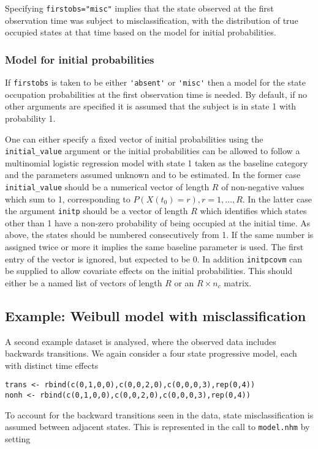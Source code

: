 \documentclass{article}
\numberwithin{equation}{section}
\begin{document}
Specifying \verb!firstobs="misc"! implies that the state observed at the first observation time was subject to misclassification, with the distribution of true occupied states at that time based on the model for initial probabilities.

\subsubsection*{Model for initial probabilities}

If \verb!firstobs! is taken to be either \verb!'absent'! or \verb!'misc'! then a model for the state occupation probabilities at the first observation time is needed. By default, if no other arguments are specified it is  assumed that the subject  is in state 1 with probability 1.

One can either specify a fixed vector of initial probabilities using the \verb!initial_value! argument or the initial probabilities can be allowed to follow a multinomial logistic regression model with state 1 taken as the baseline category and the parameters assumed unknown and to be estimated. In the former case \verb!initial_value! should be a numerical vector of length $R$ of non-negative values which sum to 1, corresponding to $P(X(t_0)= r), r=1, \ldots, R$. In the latter case the argument \verb!initp! should be a vector of length $R$ which identifies which states other than 1 have a non-zero probability of being occupied at the initial time. As above, the states should be numbered consecutively from 1. If the same number is assigned twice or more it implies the same baseline parameter is used. The first entry of the vector is ignored, but expected to be 0. In addition \verb!initpcovm! can be supplied to allow covariate effects on the initial probabilities. This should either be a named list of vectors of length $R$ or an $R \times n_c$ matrix.

\subsection{Example: Weibull model with misclassification}
\label{sec:weib_model1}

A second example dataset is analysed, where the observed data includes backwards transitions. We again consider a four state progressive model, each with distinct time effects
\begin{verbatim}
trans <- rbind(c(0,1,0,0),c(0,0,2,0),c(0,0,0,3),rep(0,4))
nonh <- rbind(c(0,1,0,0),c(0,0,2,0),c(0,0,0,3),rep(0,4))
\end{verbatim}
To account for the backward transitions seen in the data, state misclassification is assumed between adjacent states. This is represented in the call to \verb!model.nhm! by setting
\end{document}
